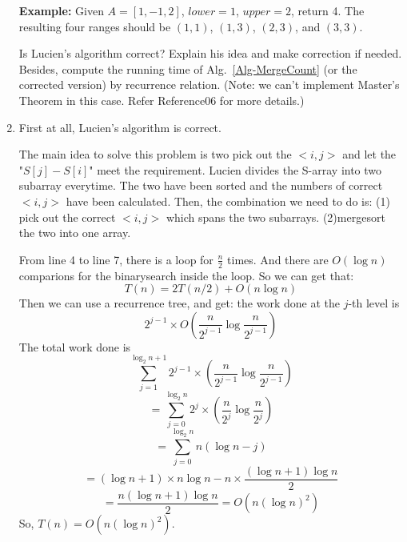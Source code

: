 \documentclass[12pt,a4paper]{article}
\makeatletter
\newtheorem*{solution}{Solution}
\theoremstyle{definition}
\renewenvironment{solution}[1][Solution] {\par\pushQED{\qed}\normalfont\topsep6\p@\@plus6\p@\relax\trivlist\item[\hskip\labelsep\bfseries#1\@addpunct{.}]\ignorespaces}{\popQED\endtrivlist\@endpefalse} \makeatother
\makeatother
\begin{document}
\begin{enumerate}
\begin{minipage}[t]{0.90\textwidth}
\begin{algorithm}[H]
		\;
		
		\end{algorithm}
\end{minipage}

    {\color{purple}\textbf{Example:} Given $A = [1,-1,2]$, $lower = 1$, $upper = 2$, return 4. The resulting four ranges should be $(1,1)$, $(1,3)$, $(2,3)$, and $(3,3)$.}

    Is Lucien's algorithm correct? Explain his idea and make correction if needed. Besides, compute the running time of Alg.~\ref{Alg-MergeCount} (or the corrected version) by recurrence relation. {\color{blue}(Note: we can't implement Master's Theorem in this case. Refer Reference06 for more details.)}

  \begin{solution}
  	First at all, Lucien's algorithm is correct.
  	
  	The main idea to solve this problem is two pick out the $<i,j>$ and let the "$S[j]-S[i]$" meet the requirement.
  	Lucien divides the S-array into two subarray everytime.
  	The two have been sorted and the numbers of correct $<i,j>$ have been calculated. Then, the combination we need to do is: (1) pick out the correct $<i,j>$ which spans the two subarrays. (2)mergesort the two into one array.
  	
  	From line 4 to line 7, there is a loop for $\frac{n}{2}$ times. And there are $O(\log n)$ comparions for the binarysearch inside the loop. So we can get that:
  	$$T(n)=2T(n/2)+O(n\log n)$$
   Then we can use a recurrence tree, and get: the work done at the $j$-th level is
   $$2^{j-1}\times O\left(\frac{n}{2^{j-1}}\log\frac{n}{2^{j-1}}\right)$$
   The total work done is
   $$\sum\limits_{j=1}^{\log_2n+1}2^{j-1}\times\left(\frac{n}{2^{j-1}}\log\frac{n}{2^{j-1}}\right)
   $$$$=\sum\limits_{j=0}^{\log_2n}2^{j}\times\left(\frac{n}{2^{j}}\log\frac{n}{2^{j}}\right)
   $$$$=\sum\limits_{j=0}^{\log_2n}n(\log n-j)$$
   $$=(\log n+1)\times n\log n-n\times\frac{(\log n+1)\log n}{2}$$ $$=\frac{n(\log n+1)\log n}{2}=O(n(\log n)^2)$$
   So, $T(n)=O(n(\log n)^2)$.  	
  	
  \end{solution}






\end{enumerate}
\end{document}
